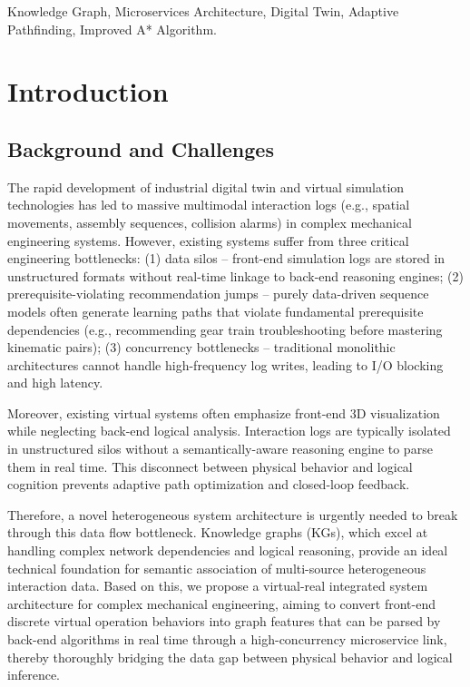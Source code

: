 \documentclass{ieeeaccess}
\begin{document}
\begin{keywords}
Knowledge Graph, Microservices Architecture, Digital Twin, Adaptive Pathfinding, Improved A* Algorithm.
\end{keywords}

\titlepgskip=-21pt

\maketitle

\section{Introduction}
\label{sec:introduction}

\subsection{Background and Challenges}
The rapid development of industrial digital twin and virtual simulation technologies has led to massive multimodal interaction logs (e.g., spatial movements, assembly sequences, collision alarms) in complex mechanical engineering systems. However, existing systems suffer from three critical engineering bottlenecks: (1) data silos – front-end simulation logs are stored in unstructured formats without real-time linkage to back-end reasoning engines; (2) prerequisite-violating recommendation jumps – purely data-driven sequence models often generate learning paths that violate fundamental prerequisite dependencies (e.g., recommending gear train troubleshooting before mastering kinematic pairs); (3) concurrency bottlenecks – traditional monolithic architectures cannot handle high-frequency log writes, leading to I/O blocking and high latency.

Moreover, existing virtual systems often emphasize front-end 3D visualization while neglecting back-end logical analysis. Interaction logs are typically isolated in unstructured silos without a semantically-aware reasoning engine to parse them in real time. This disconnect between physical behavior and logical cognition prevents adaptive path optimization and closed-loop feedback.

Therefore, a novel heterogeneous system architecture is urgently needed to break through this data flow bottleneck. Knowledge graphs (KGs), which excel at handling complex network dependencies and logical reasoning, provide an ideal technical foundation for semantic association of multi-source heterogeneous interaction data. Based on this, we propose a virtual-real integrated system architecture for complex mechanical engineering, aiming to convert front-end discrete virtual operation behaviors into graph features that can be parsed by back-end algorithms in real time through a high-concurrency microservice link, thereby thoroughly bridging the data gap between physical behavior and logical inference.
\end{document}

